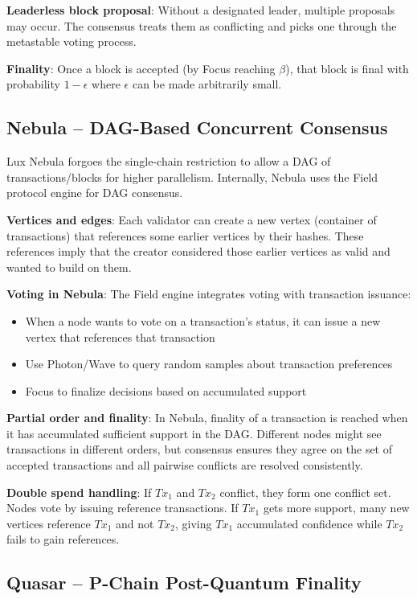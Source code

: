 \textbf{Leaderless block proposal}: Without a designated leader, multiple proposals may occur. The consensus treats them as conflicting and picks one through the metastable voting process.

\textbf{Finality}: Once a block is accepted (by Focus reaching $\beta$), that block is final with probability $1-\epsilon$ where $\epsilon$ can be made arbitrarily small.

\subsection{Nebula – DAG-Based Concurrent Consensus}

Lux Nebula forgoes the single-chain restriction to allow a DAG of transactions/blocks for higher parallelism. Internally, Nebula uses the Field protocol engine for DAG consensus.

\textbf{Vertices and edges}: Each validator can create a new vertex (container of transactions) that references some earlier vertices by their hashes. These references imply that the creator considered those earlier vertices as valid and wanted to build on them.

\textbf{Voting in Nebula}: The Field engine integrates voting with transaction issuance:
\begin{itemize}
\item When a node wants to vote on a transaction's status, it can issue a new vertex that references that transaction
\item Use Photon/Wave to query random samples about transaction preferences
\item Focus to finalize decisions based on accumulated support
\end{itemize}

\textbf{Partial order and finality}: In Nebula, finality of a transaction is reached when it has accumulated sufficient support in the DAG. Different nodes might see transactions in different orders, but consensus ensures they agree on the set of accepted transactions and all pairwise conflicts are resolved consistently.

\textbf{Double spend handling}: If $Tx_1$ and $Tx_2$ conflict, they form one conflict set. Nodes vote by issuing reference transactions. If $Tx_1$ gets more support, many new vertices reference $Tx_1$ and not $Tx_2$, giving $Tx_1$ accumulated confidence while $Tx_2$ fails to gain references.

\subsection{Quasar – P-Chain Post-Quantum Finality}

